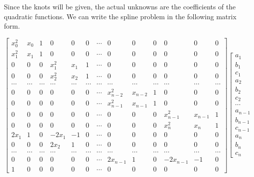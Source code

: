 \documentclass[
]{book}
\begin{document}
Since the knots will be given, the actual unknowns are the coefficients of the quadratic functions. We can write the spline problem in the following matrix form.

\[
\left[
\begin{array}{ccccccccccccc}
 x_0^2 & x_0 & 1 & 0 & 0 & 0 & \cdots & 0 & 0 & 0 & 0 & 0 & 0 \\ 
 x_1^2 & x_1 & 1 & 0 & 0 & 0 & \cdots & 0 & 0 & 0 & 0 & 0 & 0 \\ 
 0 & 0 & 0 & x_1^2 & x_1 & 1 & \cdots & 0 & 0 & 0 & 0 & 0 & 0 \\ 
 0 & 0 & 0 & x_2^2 & x_2 & 1 & \cdots & 0 & 0 & 0 & 0 & 0 & 0 \\ 
 \cdots & \cdots & \cdots & \cdots & \cdots & \cdots & \cdots & \cdots & \cdots & \cdots & \cdots & \cdots & \cdots \\ 
 0 & 0 & 0 & 0 & 0 & 0 & \cdots & x_{n-2}^2 & x_{n-2} & 1 & 0 & 0 & 0 \\ 
 0 & 0 & 0 & 0 & 0 & 0 & \cdots & x_{n-1}^2 & x_{n-1} & 1 & 0 & 0 & 0 \\ 
 0 & 0 & 0 & 0 & 0 & 0 & \cdots & 0 & 0 & 0 & x_{n-1}^2 & x_{n-1} & 1 \\ 
 0 & 0 & 0 & 0 & 0 & 0 & \cdots & 0 & 0 & 0 & x_n^2 & x_n & 1 \\ 
 2x_1 & 1 & 0 & - 2x_1 & -1 & 0 & \cdots & 0 & 0 & 0 & 0 & 0 & 0\\ 
 0 & 0 & 0 & 2x_2 & 1 & 0 & \cdots & 0 & 0 & 0 & 0 & 0 & 0\\ 
 \cdots & \cdots & \cdots & \cdots & \cdots & \cdots & \cdots & \cdots & \cdots & \cdots & \cdots & \cdots & \cdots \\ 
 0 & 0 & 0 & 0 & 0 & 0 & \cdots &2x_{n-1} & 1 & 0 & -2x_{n-1}& -1 &  0\\ 
 1 & 0 & 0 & 0 & 0 & 0 & \cdots & 0 & 0 & 0 & 0 & 0 & 0
\end{array}
\right]
\left[
\begin{array}{c}
 a_1 \\ 
 b_1 \\ 
 c_1 \\
 a_2 \\
 b_2 \\
 c_2 \\
\cdots \\
a_{n-1} \\
b_{n-1} \\
c_{n-1} \\
a_n \\
b_n \\
c_n
\end{array}
\]
\end{document}
